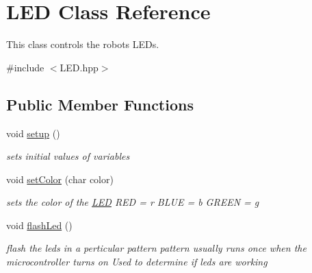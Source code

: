 \hypertarget{class_l_e_d}{}\section{L\+ED Class Reference}
\label{class_l_e_d}


This class controls the robots L\+E\+Ds.  




{\ttfamily \#include $<$L\+E\+D.\+hpp$>$}

\subsection*{Public Member Functions}
\begin{DoxyCompactItemize}
\item 
\mbox{\label{class_l_e_d_abb089672733ef180aa8cddc8d3a37d9e}} 
void \mbox{\hyperlink{class_l_e_d_abb089672733ef180aa8cddc8d3a37d9e}{setup}} ()
\begin{DoxyCompactList}\small\item\em sets initial values of variables \end{DoxyCompactList}\item 
\mbox{\label{class_l_e_d_ad122ee4ef58452558498c249fc293870}} 
void \mbox{\hyperlink{class_l_e_d_ad122ee4ef58452558498c249fc293870}{set\+Color}} (char color)
\begin{DoxyCompactList}\small\item\em sets the color of the \mbox{\hyperlink{class_l_e_d}{L\+ED}} R\+ED = \textquotesingle{}r\textquotesingle{} B\+L\+UE = \textquotesingle{}b\textquotesingle{} G\+R\+E\+EN = \textquotesingle{}g\textquotesingle{} \end{DoxyCompactList}\item 
\mbox{\label{class_l_e_d_aaff2c983e84d429526ed087653bab10c}} 
void \mbox{\hyperlink{class_l_e_d_aaff2c983e84d429526ed087653bab10c}{flash\+Led}} ()
\begin{DoxyCompactList}\small\item\em flash the leds in a perticular pattern pattern usually runs once when the microcontroller turns on Used to determine if leds are working \end{DoxyCompactList}\end{DoxyCompactItemize}
